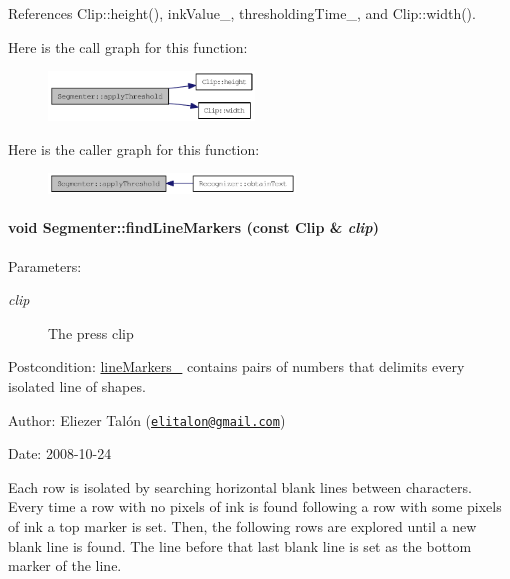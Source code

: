 References Clip::height(), inkValue\_\-, thresholdingTime\_\-, and Clip::width().

Here is the call graph for this function:\nopagebreak
\begin{figure}[H]
\begin{center}
\leavevmode
\includegraphics[width=155pt]{class_segmenter_6854315e3320f9d9a8ece14cbb8570ee_cgraph}
\end{center}
\end{figure}


Here is the caller graph for this function:\nopagebreak
\begin{figure}[H]
\begin{center}
\leavevmode
\includegraphics[width=186pt]{class_segmenter_6854315e3320f9d9a8ece14cbb8570ee_icgraph}
\end{center}
\end{figure}
\hypertarget{class_segmenter_ad8893282742e811dd7fff172ec03c85}{
\paragraph[{findLineMarkers}]{\setlength{\rightskip}{0pt plus 5cm}void Segmenter::findLineMarkers (const {\bf Clip} \& {\em clip})}\hfill}
\label{class_segmenter_ad8893282742e811dd7fff172ec03c85}


\begin{Desc}
\item[Parameters:]
\begin{description}
\item[{\em clip}]The press clip\end{description}
\end{Desc}
\begin{Desc}
\item[Postcondition:]\hyperlink{class_segmenter_2789fd760ed7604765b3b147be454c09}{lineMarkers\_\-} contains pairs of numbers that delimits every isolated line of shapes.\end{Desc}
\begin{Desc}
\item[Author:]Eliezer Talón (\href{mailto:elitalon@gmail.com}{\tt elitalon@gmail.com}) \end{Desc}
\begin{Desc}
\item[Date:]2008-10-24\end{Desc}
Each row is isolated by searching horizontal blank lines between characters. Every time a row with no pixels of ink is found following a row with some pixels of ink a top marker is set. Then, the following rows are explored until a new blank line is found. The line before that last blank line is set as the bottom marker of the line. 

